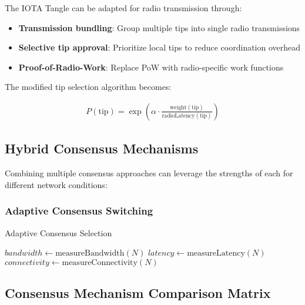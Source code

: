 \documentclass[11pt,a4paper]{article}
\begin{document}
The IOTA Tangle can be adapted for radio transmission through:

\begin{itemize}
\item \textbf{Transmission bundling}: Group multiple tips into single radio transmissions
\item \textbf{Selective tip approval}: Prioritize local tips to reduce coordination overhead
\item \textbf{Proof-of-Radio-Work}: Replace PoW with radio-specific work functions
\end{itemize}

The modified tip selection algorithm becomes:

\begin{align}
P(\text{tip}) = \exp\left(\alpha \cdot \frac{\text{weight}(\text{tip})}{\text{radioLatency}(\text{tip})}\right)
\end{align}

\subsection{Hybrid Consensus Mechanisms}

Combining multiple consensus approaches can leverage the strengths of each for different network conditions:

\subsubsection{Adaptive Consensus Switching}

\begin{algorithm}[H]
\SetAlgoLined
{}
\caption{Adaptive Consensus Selection}

$bandwidth \leftarrow \text{measureBandwidth}(N)$\;
$latency \leftarrow \text{measureLatency}(N)$\;
$connectivity \leftarrow \text{measureConnectivity}(N)$\;

\end{algorithm}

\subsection{Consensus Mechanism Comparison Matrix}
\end{document}
